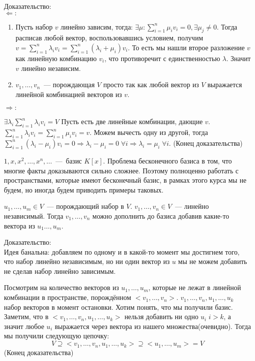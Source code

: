 Доказательство:\\
$\Leftarrow: $
\begin{enumerate}
    \item Пусть набор $v$ линейно зависим, тогда: $\exists \mu : \sum_{i=1}^{n}\mu_iv_i=0, \exists \mu_j\not=0$.
        Тогда расписав любой вектор, воспользовавшись условием, получим 
        $v = \sum_{i=1}^{n}\lambda_iv_i = \sum_{i=1}^{n}(\lambda_i+\mu_i)v_i$. То есть мы нашли
        второе разложение $v$ как линейную комбинацию $v_i$, что противоречит с единственностью $\lambda$.
        Значит $v$ линейно независим.
    \item $v_1,\dots, v_n$~--- порождающая $V$ просто так как любой вектор из $V$ выражается
        линейной комбинацией векторов из $v$.
\end{enumerate}
$\Rightarrow:$

$\exists \lambda_i \sum_{i=1}^{n} \lambda_iv_i = V$
Пусть есть две линейные комбинации, дающие $v$.
$\sum_{i=1}^{n} \lambda_iv_i = \sum_{i=1}^{n} \mu_iv_i = v$. Можем вычесть одну из другой, тогда
$\sum_{i=1}^{n}(\lambda_i - \mu_i)v_i = 0\Rightarrow \lambda_i-\mu_i=0\;\forall i
\Rightarrow \lambda_i = \mu_i\;\forall i$.
(Конец доказательства)
\bigskip

 $1, x, x^2, \dots, x^n, \dots$~---~базис $K[x]$. 
Проблема бесконечного базиса в том, что многие факты доказываются сильно сложнее.
Поэтому полноценно работать с пространствами, которые имеют бесконечный базис, в рамках этого
курса мы не будем, но иногда будем приводить примеры таковых.

\thm $u_1,\dots,u_m\in V$~--- порождающий набор в $V$. $v_1,\dots,v_n\in V$~---
линейно независимый. Тогда $v_1,\dots, v_n$ можно дополнить до базиса добавив
какие-то вектора из $u_1\dots, u_m$.

Доказательство:\\
Идея банальна: добавляем по одному и в какой-то момент мы достигнем того, что набор
линейно независимым, но ни один вектор из $u$ мы не можем добавить не сделав набор
линейно зависимым.

Посмотрим на количество векторов из $u_1,\dots, u_m$, которые не
лежат в линейной комбинации в пространстве, порождённом $<v_1,\dots, v_n>$.
$v_1,\dots,v_n, u_1,\dots, u_k$ набор векторов в момент остановки. Хотим понять, что
мы получили базис.
Заметим, что в $<v_1,\dots,v_n,u_1,\dots,u_k>$ нельзя добавить ни одно $u_i\; i > k$, а значит
любое $u_i$ выражается через вектора из нашего множества(очевидно). Тогда мы получили
следующую цепочку:
$$V\supseteq <v_1,\dots,v_n, u_1,\dots,u_k> \supseteq <u_1,\dots,u_m>=V$$
(Конец доказательства)
\bigskip

